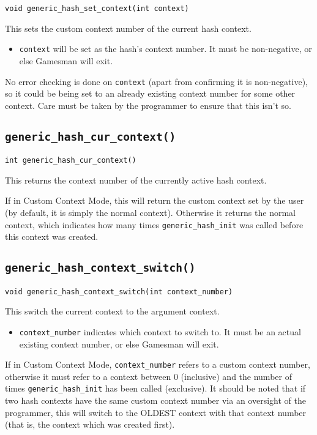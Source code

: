 \documentclass[11pt]{article}
\begin{document}
\texttt{void generic\_hash\_set\_context(int context)}

This sets the custom context number of the current hash context.

\begin{itemize}
\item \texttt{context} will be set as the hash's context number. It must be non-negative, or else Gamesman will exit.
\end{itemize}

No error checking is done on \texttt{context} (apart from confirming it is non-negative), so it could be being set to an already existing context number for some other context. Care must be taken by the programmer to ensure that this isn't so.

\subsection{\texttt{generic\_hash\_cur\_context()}}

\texttt{int generic\_hash\_cur\_context()}

This returns the context number of the currently active hash context.

If in Custom Context Mode, this will return the custom context set by the user (by default, it is simply the normal context). Otherwise it returns the normal context, which indicates how many times \texttt{generic\_hash\_init} was called before this context was created.


\subsection{\texttt{generic\_hash\_context\_switch()}}

\texttt{void generic\_hash\_context\_switch(int context\_number)}

This switch the current context to the argument context.

\begin{itemize}
\item \texttt{context\_number} indicates which context to switch to. It must be an actual existing context number, or else Gamesman will exit.
\end{itemize}

If in Custom Context Mode, \texttt{context\_number} refers to a custom context number, otherwise it must refer to a context between 0 (inclusive) and the number of times \texttt{generic\_hash\_init} has been called (exclusive). It should be noted that if two hash contexts have the same custom context number via an oversight of the programmer, this will switch to the OLDEST context with that context number (that is, the context which was created first).
\end{document}
